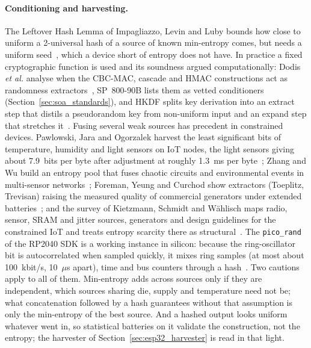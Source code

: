 \paragraph{Conditioning and harvesting.} The Leftover Hash Lemma of
Impagliazzo, Levin and Luby bounds how close to uniform a 2-universal hash
of a source of known min-entropy comes, but needs a uniform
seed~\cite{impagliazzo_1989_pseudorandom}, which a device short of entropy
does not have. In practice a fixed cryptographic function is used and its
soundness argued computationally: Dodis \emph{et al.} analyse when the
CBC-MAC, cascade and HMAC constructions act as randomness
extractors~\cite{dodis_2004_randomness}, SP~800-90B lists them as vetted
conditioners (Section~\ref{sec:soa_standards}), and HKDF splits key
derivation into an extract step that distils a pseudorandom key from
non-uniform input and an expand step that stretches it~\cite{krawczyk_2010_hkdf}.
Fusing several weak sources has precedent in constrained devices. Pawlowski,
Jara and Ogorzalek harvest the least significant bits of temperature,
humidity and light sensors on IoT nodes, the light sensors giving about
7.9~bits per byte after adjustment at roughly 1.3~ms per
byte~\cite{pawlowski_2015_harvesting}; Zhang and Wu build an entropy pool
that fuses chaotic circuits and environmental events in multi-sensor
networks~\cite{zhang_2023_heterogeneous}; Foreman, Yeung and Curchod show
extractors (Toeplitz, Trevisan) raising the measured quality of commercial
generators under extended batteries~\cite{foreman_2024_statistical}; and
the survey of Kietzmann, Schmidt and W\"ahlisch maps radio, sensor, SRAM
and jitter sources, generators and design guidelines for the constrained
IoT and treats entropy scarcity there as structural~\cite{kietzmann_2021_guideline}.
The \texttt{pico\_\allowbreak{}rand} of the RP2040 SDK is a working instance in silicon:
because the ring-oscillator bit is autocorrelated when sampled quickly, it
mixes ring samples (at most about 100~kbit/s, 10~$\mu$s apart), time and
bus counters through a hash~\cite{rpi_forum_picorand}. Two cautions apply
to all of them. Min-entropy adds across sources only if they are
independent, which sources sharing die, supply and temperature need not be;
what concatenation followed by a hash guarantees without that assumption is
only the min-entropy of the best source. And a hashed output looks uniform
whatever went in, so statistical batteries on it validate the construction,
not the entropy; the harvester of Section~\ref{sec:esp32_harvester} is read
in that light.

